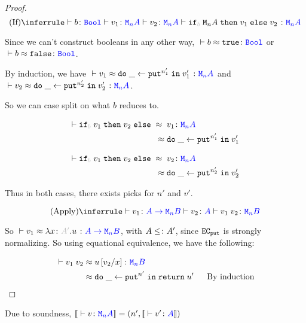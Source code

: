 \documentclass{Report}
\begin{document}
\begin{proof}
\begin{equation}
    \ntreeruleIII{If}{\ztyperelation{b}{\B}}{\ztyperelation{v_1}{\mna}}{\ztyperelation{v_2}{\mna}}{\ztyperelation{\pifthenelse{b}{\mna}{v_1}{v_2}}{\mna}}    
\end{equation}

Since we can't construct booleans in any other way, $\zberelation{b}{\t}{\B}$ or $\zberelation{b}{\f}{\B}$.

By induction, we have $\zberelation{v_1}{\doin{\_}{\put^{n_1'}}{v_1'}}{\mna}$ and $\zberelation{v_2}{\doin{\_}{\put^{n_2'}}{v_2'}}{\mna}$.

So we can case split on what $b$ reduces to.

\begin{align}
   \zberelation{\pifthenelse{b}{v_1}{v_2}}{&\s v_1}{\mna}\\
   \beequiv&\s \doin{\_}{\put^{n_1'}}{v_1'}
\end{align}

\begin{align}
    \zberelation{\pifthenelse{b}{v_1}{v_2}}{&\s v_2}{\mna}\\
    \beequiv&\s \doin{\_}{\put^{n_2'}}{v_2'}
 \end{align} 

 Thus in both cases, there exists picks for $n'$ and $v'$.


 \begin{equation}
     \ntreeruleII{Apply}{\ztyperelation{v_1}{\fntype{A}{\mnb}}}{\ztyperelation{v_2}{A}}{\ztyperelation{\apply{v_1}{v_2}}{\mnb}}
 \end{equation}

 So $\zberelation{v_1}{\lam{x}{A'}{u}}{\fntype{A}{\mnb}}$, with $A \leq\colon A'$, since $\texttt{EC}_{\texttt{put}}$ is strongly normalizing. So using equational equivalence, we have the following:

 \begin{align}
     \zberelation{\apply{v_1}{v_2}}{&\s u\ssub{x}{v_2}}{\mnb}\\
     \beequiv&\s \doin{\_}{\put^{n'}}{\return{u'}}\qt{By induction}
 \end{align}

\end{proof}

\begin{corollary}
    Due to soundness, $\deno{\ztyperelation{v}{\mna}} = (n', \deno{\ztyperelation{v'}{A}})$
\end{corollary}
\end{document}
